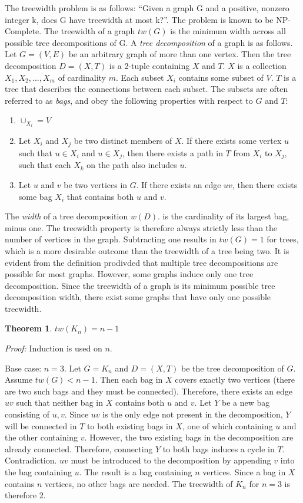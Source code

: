 \documentclass[12pt,conference]{IEEEtran}
\theoremstyle{plain}
\newtheorem{theorem}{Theorem}
\begin{document}
The treewidth problem is as follows: ``Given a graph G and a positive, nonzero integer k, does G have treewidth at most k?''. The problem is known to be NP-Complete. The treewidth of a graph $tw(G)$ is the minimum width across all possible tree decompositions of G. A \textit{tree decomposition} of a graph is as follows. Let $G=(V,E)$ be an arbitrary graph of more than one vertex. Then the tree decomposition $D = (X,T)$ is a 2-tuple containing $X$ and $T$. $X$ is a collection $X_{1}, X_{2}, ..., X_{m}$ of cardinality $m$. Each subset $X_{i}$ contains some subset of $V$. $T$ is a tree that describes the connections between each subset. The subsets are often referred to as \textit{bags}, and obey the following properties with respect to $G$ and $T$:

\begin{enumerate}
\item $\cup_{X_{i}} = V$
\item Let $X_{i}$ and $X_{j}$ be two distinct members of $X$. If there exists some vertex $u$ such that $u \in X_{i}$ and $u \in X_{j}$, then there exists a path in $T$ from $X_{i}$ to $X_{j}$, such that each $X_{k}$ on the path also includes $u$.
\item Let $u$ and $v$ be two vertices in $G$. If there exists an edge $uv$, then there exists some bag $X_{i}$ that contains both $u$ and $v$.
\end{enumerate}

The \textit{width} of a tree decomposition $w(D)$. is the cardinality of its largest bag, minus one. The treewidth property is therefore always strictly less than the number of vertices in the graph. Subtracting one results in $tw(G)=1$ for trees, which is a more desirable outcome than the treewidth of a tree being two. It is evident from the definition prodivded that multiple tree decompositions are possible for most graphs. However, some graphs induce only one tree decomposition. Since the treewidth of a graph is its minimum possible tree decomposition width, there exist some graphs that have only one possible treewidth.

\begin{theorem}
  $tw(K_{n}) = n-1$
\end{theorem}

\textit{Proof:} Induction is used on $n$. 

Base case: $n=3$. Let $G=K_{n}$ and $D=(X,T)$ be the tree decomposition of $G$. Assume $tw(G) < n-1$. Then each bag in $X$ covers exactly two vertices (there are two such bags and they must be connected). Therefore, there exists an edge $uv$ such that neither bag in $X$ contains both $u$ and $v$. Let $Y$ be a new bag consisting of $u,v$. Since $uv$ is the only edge not present in the decomposition, $Y$ will be connected in $T$ to both existing bags in $X$, one of which containing $u$ and the other containing $v$. However, the two existing bags in the decomposition are already connected. Therefore, connecting $Y$ to both bags induces a cycle in $T$. Contradiction. $uv$ must be introduced to the decomposition by appending $v$ into the bag containing $u$. The result is a bag containing $n$ vertices. Since a bag in $X$ contains $n$ vertices, no other bags are needed. The treewidth of $K_{n}$ for $n=3$ is therefore 2. 
\end{document}
